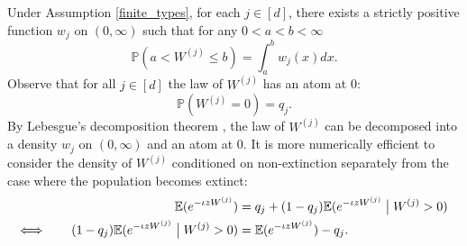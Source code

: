 \documentclass[preprint,3p,12pt]{elsarticle}
\theoremstyle{definition}
\begin{document}
Under Assumption \ref{finite_types}, for each $j \in [d]$, there exists a strictly positive function $w_j$ on $(0, \infty)$ \cite[Chapter 5.6]{athreya_ney} such that for any $0 < a<b< \infty$
\begin{equation*}
    \mathbb{P}(a < W^{(j)} \le b) = \int_a^b w_j(x) dx.
\end{equation*}
 Observe that for all $j \in [d]$ the law of $W^{(j)}$ has an atom at 0:
\begin{equation}
    \mathbb{P}(W^{(j)} = 0) = q_j.
\end{equation}
By Lebesgue's decomposition theorem \cite[Theorem 2.10, p.\ 40]{kallenberg}, the law of $W^{(j)}$ can be decomposed into a density $w_j$ on $(0, \infty)$ and an atom at $0$.
It is more numerically efficient to consider the density of $W^{(j)}$ conditioned on non-extinction separately from the case where the population becomes extinct: %
\begin{align}
    \mathbb{E}(e^{-\iota zW^{(j)}}) &= q_j +(1-q_j)  \mathbb{E}(e^{-\iota zW^{(j)}} \bigm| W^{(j)} > 0) \notag\\
\Longleftrightarrow\qquad    (1-q_j)  \mathbb{E}(e^{- \iota zW^{(j)}}\bigm| W^{(j)} > 0) &= \mathbb{E}(e^{-\iota zW^{(j)}})  - q_j \label{eq:non_extinction}.
\end{align}
\end{document}
